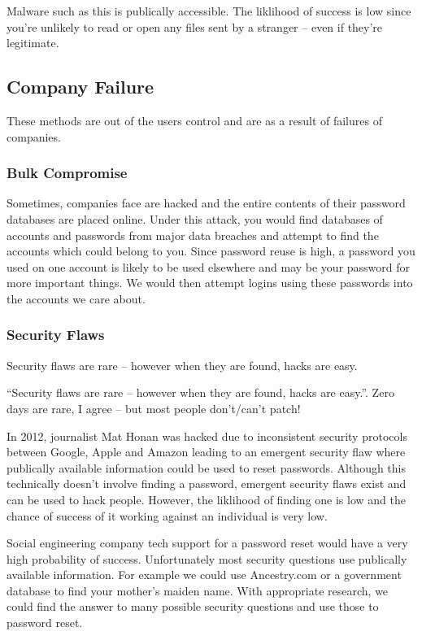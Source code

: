 \documentclass[10pt,\jkfside,a4paper]{article}
\begin{document}
\begin{enumerate}
Malware such as this is publically accessible. The liklihood of success is low since you're unlikely 
to read or open any files sent by a stranger -- even if they're legitimate.

\subsection*{Company Failure}

These methods are out of the users control and are as a result of failures of companies.

\subsubsection*{Bulk Compromise}

Sometimes, companies face are hacked and the entire contents of their password databases are 
placed online. Under this attack, you would find databases of accounts and passwords from 
major data breaches and attempt to find the accounts which could belong to you. Since password 
reuse is high, a password you used on one account is likely to be used elsewhere and may be 
your password for more important things. We would then attempt logins using these passwords 
into the accounts we care about.

\subsubsection*{Security Flaws}

Security flaws are rare -- however when they are found, hacks are easy.

{\color{blue} ``Security flaws are rare -- however when they are found, hacks are easy.''. Zero days are rare, I
agree -- but most people don't/can't patch!}

In 2012, journalist Mat Honan was hacked due to inconsistent security protocols between Google, Apple 
and Amazon leading to an emergent security flaw where publically available information could be used 
to reset passwords. Although this technically doesn't involve finding a password, emergent security 
flaws exist and can be used to hack people. However, the liklihood of finding one is low and the chance 
of success of it working against an individual is very low.

Social engineering company tech support for a password reset would have a very high probability of 
success. Unfortunately most security questions use publically available information. For example 
we could use Ancestry.com or a government database to find your mother's maiden name. With appropriate 
research, we could find the answer to many possible security questions and use those to password reset.


\end{enumerate}
\end{document}
